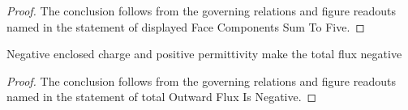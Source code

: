 \begin{proof}
  The conclusion follows from the governing relations and figure readouts named in the statement of displayed Face Components Sum To Five.
\end{proof}
\begin{lemma}
  \label{lem:physics:phyx-mini-0841:phyxminiproblems-problemphyxmini0841-totaloutwardfluxisnegative}
  Negative enclosed charge and positive permittivity make the total flux negative
\end{lemma}
\begin{proof}
  The conclusion follows from the governing relations and figure readouts named in the statement of total Outward Flux Is Negative.
\end{proof}
